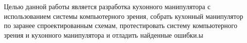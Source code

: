 Целью данной работы является разработка кухонного манипулятора с использованием системы компьютерного зрения, собрать кухонный манипулятор по заранее спроектированным схемам, протестировать систему компьютерного зрения и кухонного манипулятора и отладить найденные ошибки.ы